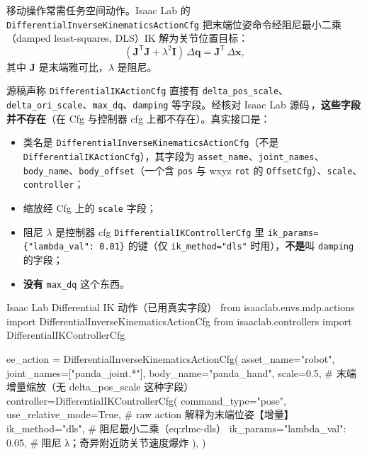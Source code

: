 移动操作常需任务空间动作。Isaac Lab 的 \verb|DifferentialInverseKinematicsActionCfg| 把末端位姿命令经阻尼最小二乘（damped least-squares, DLS）IK 解为关节位置目标：
\begin{equation}
(\mathbf J^{\mathsf T}\mathbf J + \lambda^2\mathbf I)\,\Delta\mathbf q = \mathbf J^{\mathsf T}\,\Delta\mathbf x,
\label{eq:rlmc-dls}
\end{equation}
其中 $\mathbf J$ 是末端雅可比，$\lambda$ 是阻尼。

\begin{pitfall}
源稿声称 \verb|DifferentialIKActionCfg| 直接有 \verb|delta_pos_scale|、\verb|delta_ori_scale|、\verb|max_dq|、\verb|damping| 等字段。经核对 Isaac Lab 源码\,\cite{isaaclab2024}，\textbf{这些字段并不存在}（在 Cfg 与控制器 cfg 上都不存在）。真实接口是：
\begin{itemize}
  \item 类名是 \verb|DifferentialInverseKinematicsActionCfg|（不是 \verb|DifferentialIKActionCfg|），其字段为 \verb|asset_name|、\verb|joint_names|、\verb|body_name|、\verb|body_offset|（一个含 \verb|pos| 与 wxyz \verb|rot| 的 \verb|OffsetCfg|）、\verb|scale|、\verb|controller|；
  \item 缩放经 Cfg 上的 \verb|scale| 字段；
  \item 阻尼 $\lambda$ 是控制器 cfg \verb|DifferentialIKControllerCfg| 里 \verb|ik_params={"lambda_val": 0.01}| 的键（仅 \verb|ik_method="dls"| 时用），\textbf{不是}叫 \verb|damping| 的字段；
  \item \textbf{没有} \verb|max_dq| 这个东西。
\end{itemize}
\end{pitfall}

\begin{codebox}[Python]{Isaac Lab Differential IK 动作（已用真实字段）}
from isaaclab.envs.mdp.actions import DifferentialInverseKinematicsActionCfg
from isaaclab.controllers import DifferentialIKControllerCfg

ee_action = DifferentialInverseKinematicsActionCfg(
    asset_name="robot",
    joint_names=["panda_joint.*"],
    body_name="panda_hand",
    scale=0.5,                          # 末端增量缩放（无 delta_pos_scale 这种字段）
    controller=DifferentialIKControllerCfg(
        command_type="pose",
        use_relative_mode=True,         # raw action 解释为末端位姿【增量】
        ik_method="dls",                # 阻尼最小二乘（eq:rlmc-dls）
        ik_params={"lambda_val": 0.05}, # 阻尼 λ；奇异附近防关节速度爆炸
    ),
)
\end{codebox}

